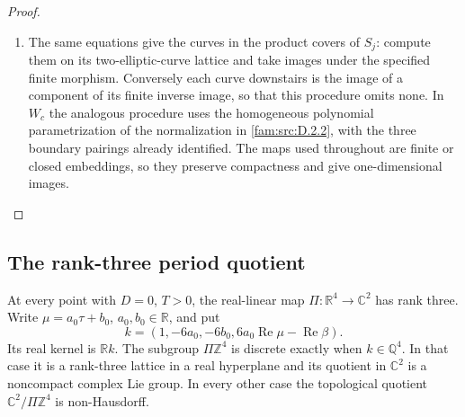 \begin{proof}
\begin{enumerate}[label=\arabic*.,leftmargin=*]
\item The same equations give the curves in the product covers of $S_j$:
compute them on its two-elliptic-curve lattice and take images under the
specified finite morphism. Conversely each curve downstairs is the image
of a component of its finite inverse image, so that this procedure omits
none. In $W_c$ the analogous procedure uses the homogeneous polynomial
parametrization of the normalization in \ref{fam:src:D.2.2}, with the three boundary
pairings already identified. The maps used throughout are finite or
closed embeddings, so they preserve compactness and give one-dimensional
images.
\end{enumerate}
\end{proof}







\subsection{The rank-three period quotient}\hypertarget{tag-01PN}{}\label{fam:section:C.3}
\begin{proposition}\hypertarget{tag-01QM}{}\label{fam:src:C.3.1}\label{fam:st:C.3.1}

At every point with \(D=0\), \(T>0\), the real-linear map
\(\Pi:\mathbb R^4\to\mathbb C^2\) has rank three. Write
\(\mu=a_0\tau+b_0\), \(a_0,b_0\in\mathbb R\), and put
\[
 k=(1,-6a_0,-6b_0,6a_0\operatorname{Re}\mu-\operatorname{Re}\beta).
\]
Its real kernel is \(\mathbb R k\). The subgroup \(\Pi\mathbb Z^4\) is
discrete exactly when \(k\in\mathbb Q^4\). In that case it is a
rank-three lattice in a real hyperplane and its quotient in \(\mathbb C^2\)
is a noncompact complex Lie group. In every other case the topological
quotient \(\mathbb C^2/\Pi\mathbb Z^4\) is non-Hausdorff.
\end{proposition}


